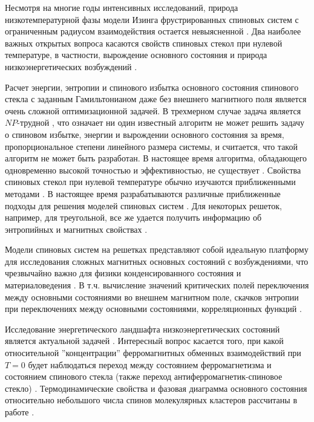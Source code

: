 \documentclass[utf8, babel, sor, jor, amsmath, amssymb, reprint]{elsarticle} %
\begin{document}
Несмотря на многие годы интенсивных исследований, природа низкотемпературной фазы модели Изинга фрустрированных спиновых систем с ограниченным радиусом взаимодействия остается невыясненной \cite{newman2023proof}. Два наиболее важных открытых вопроса касаются свойств спиновых стекол при нулевой температуре, в частности, вырождение основного состояния и природа низкоэнергетических возбуждений \cite{newman2022ground}.  

Расчет энергии, энтропии и спинового избытка основного состояния спинового стекла с заданным Гамильтонианом даже без внешнего магнитного поля является очень сложной оптимизационной задачей. В трехмерном случае задача является $NP$-трудной \cite{barahona1982computational, hartmann2002optimization}, что означает ни один известный алгоритм не может решить задачу о спиновом избытке, энергии и вырождении основного состояния за время, пропорциональное степени линейного размера системы, и считается, что такой алгоритм не может быть разработан. В настоящее время алгоритма, обладающего одновременно высокой точностью и эффективностью, не существует \cite{fan2023searching}. Свойства спиновых стекол при нулевой температуре обычно изучаются приближенными методами \cite{perez2012ground}. В настоящее время разрабатываются различные приближенные подходы для решения моделей спиновых систем \cite{perez2012ground, rybin2022hybrid, makarova2023canonical,farias2024differentiable}.  Для некоторых решеток, например, для треугольной, все же удается получить информацию об энтропийных и магнитных свойствах \cite{jurvcivsinova2024classical}.

Модели спиновых систем на решетках представляют собой идеальную платформу для исследования сложных магнитных основных состояний с возбуждениями, что чрезвычайно важно для физики конденсированного состояния и материаловедения \cite{lacroix2011introduction}. В т.ч. вычисление значений критических полей переключения между основными состояниями во внешнем магнитном поле, скачков энтропии при переключениях между основными состояниями, корреляционных функций \cite{ramirez2004effect, rosas2004random, andriushchenko2019large}. 

Исследование энергетического ландшафта низкоэнергетических состояний является актуальной задачей \cite{biswas2023energy}. Интересный вопрос касается того, при какой относительной ''концентрации''  ферромагнитных обменных взаимодействий при $T=0$ будет наблюдаться переход между состоянием ферро\-маг\-не\-тиз\-ма и состоянием спинового стекла (также переход анти\-ферро\-маг\-не\-тик-спиновое стекло) \cite{zimmer2022role}. Термодинамические свойства и фазовая диаграмма основного состояния относительно небольшого числа спинов молекулярных кластеров рассчитаны в работе \cite{dias2023ground}.
\end{document}
